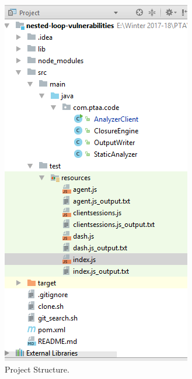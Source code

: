 \documentclass[authoryear,preprint]{sigplanconf}
\begin{document}
\begin{figure}[ht]
\centering
\includegraphics[width=1\linewidth]{figures/project-structure}
\caption[Project Structure]{\label{f:structure}Project Structure.}
\end{figure}
\end{document}
